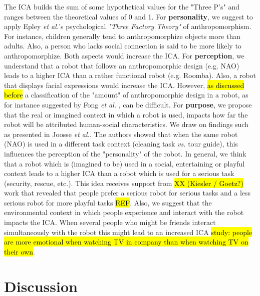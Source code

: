 \documentclass[twocolumn]{svjour3}          %
\begin{document}
	The ICA builds the sum of some hypothetical values for the "Three P's" and ranges between the theoretical values of 0 and 1.
	For \textbf{personality}, we suggest to apply Epley \textit{et al.}'s psychological \textit{"Three Factory Theory"} of anthropomorphism. For instance, children generally tend to anthropomorphize objects more than adults. Also, a person who lacks social connection is said to be more likely to anthropomorphize. Both aspects would increase the ICA.
	For \textbf{perception}, we understand that a robot that follows an anthropomorphic design (e.g. NAO) leads to a higher ICA than a rather functional robot (e.g. Roomba). Also, a robot that displays facial expressions would increase the ICA. However, \hl{as discussed before} a classification of the "amount" of anthropomorphic design in a robot, as for instance suggested by Fong \textit{et al.} \cite{fong_survey_2003}, can be difficult.
	For \textbf{purpose}, we propose that the real or imagined context in which a robot is used, impacts how far the robot will be attributed human-social characteristics. We	draw on findings such as presented in Joosse \textit{et al.}. The authors showed that when the same robot (NAO) is used in a different task context (cleaning task \textit{vs.} tour guide), this influences the perception of the "personality" of the robot. In general, we think that a robot which is (imagined to be) used in a social, entertaining or playful context leads to a higher ICA than a robot which is used for a serious task (security, rescue, etc.). This idea receives support from \hl{XX (Kiesler / Goetz?)} work that revealed that people prefer a serious robot for serious tasks and a less serious robot for more playful tasks \hl{REF}. Also, we suggest that the environmental context in which people experience and interact with the robot impacts the ICA. When several people who might be friends interact simultaneously with the robot this might lead to an increased ICA \hl{study: people are more emotional when watching TV in company than when watching TV on their own}.






%
%
%
%
%
%

\section{Discussion}
\label{sec:8}
\end{document}
